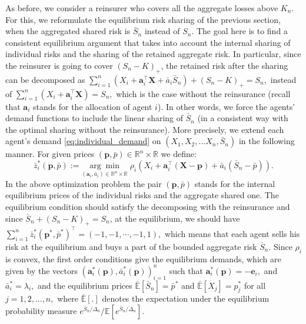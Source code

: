 \documentclass[fleqn,mnsc,nonblindrev]{informs4}
\newcommand{\EE}{\mathbb{E}}
\newcommand{\tb}[1]{\textbf{#1}}
\begin{document}
As before, we consider a reinsurer who covers all the aggregate losses above $K_n$. 
For this, we reformulate the equilibrium risk sharing of the previous section, when the aggregated shared risk is $\bar{S}_n$ instead of $S_n$. The goal here is to find a consistent equilibrium argument that takes into account the internal sharing of individual risks and the sharing of the retained aggregate risk. In particular, since the reinsurer is going to cover $(S_n-K)_+$, the retained risk after the sharing can be decomposed as  {$\sum_{i=1}^n\left(X_i+\tb{a}_{i}^\top \tb{X}+\bar{a}_i\bar{S}_n\right)+(S_n-K)_+=S_n,$ instead of $\sum_{i=1}^n\left(X_i+\tb{a}_{i}^\top \tb{X}\right)=S_n,$} which is the case without the reinsurance (recall that $\tb{a}_{i}$ stands for the allocation of agent $i$). In other words, we force the agents' demand functions to include the linear sharing of $\bar{S}_n$ (in a consistent way with the optimal sharing without the reinsurance). More precisely, we extend each agent's demand \eqref{eq:individual_demand} on $(X_1,X_2,...X_n,\bar{S}_n)$ in the following manner. For given prices $(\tb{p},\bar{p})\in\mathbb{R}^n\times\mathbb{R}$ we define: 
\[
\bar{z}^*_i(\tb{p},\bar{p}):=\underset{(\tb{a}_i,\bar{a}_i)\in\mathbb{R}^n\times\mathbb{R}}{\arg \min}\; \rho_i(X_i+\tb{a}_i^\top( \tb{X}- \tb{p}) +\bar{a}_i(\bar{S}_n  -\bar{p})).
\] 
In the above optimization problem the pair $(\tb{p},\bar{p})$ stands for the internal equilibrium prices of the individual risks and the aggregate shared one. The equilibrium condition should satisfy the decomposing with the reinsurance and since $\bar{S}_n+(S_n-K)_+=S_n$, at the equilibrium, we should have   {$\sum_{i=1}^n\bar{z}^*_i(\tb{p}^*,\bar{p}^*)^\top=(-1,-1,\cdots,-1,1),$} which means that each agent sells his risk at the equilibrium and buys a part of the bounded aggregate risk $\bar{S}_n$. Since $\rho_i$ is convex, the first order conditions  {give the} equilibrium demands, which are given by the vectors $(\tb{a}_{i}^*(\tb{p}),\bar{a}_i^*(\tb{p}))_{i=1}^n$   {such that $\tb{a}_i^*(\tb{p})= -\tb{e}_i,$ and $\bar{a}_i^*=\lambda_i,$} and the equilibrium prices   {$\bar{\EE}[\bar{S}_n]=\bar{p}^*$ and $\bar{\EE}[X_j]=p^*_j$ for all $j=1,2,...,n,$} where $\bar{\EE}[.]$ denotes the expectation under the equilibrium probability measure $ e^{\bar{S}_n/\Delta_{n}}/\EE[e^{\bar{S}_n/\Delta_{n}}]$.
\end{document}
